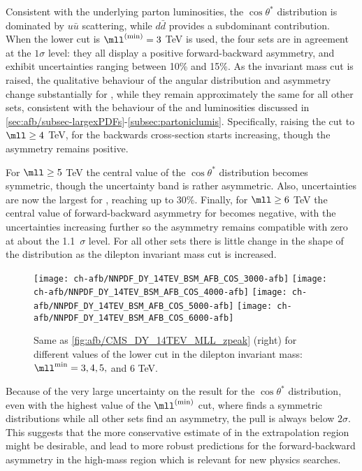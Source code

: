  Consistent with the underlying parton luminosities, the $\cos\theta^*$ distribution
 is dominated by $u\bar{u}$ scattering, while  $d\bar{d}$ provides
 a subdominant contribution.
 When the lower cut  is $\mll^{(\rm min)}=3$ TeV is used, the four \pdf
 sets are in agreement at the $1\sigma$ level: they all
 display a 
 positive forward-backward asymmetry, and exhibit \pdf uncertainties ranging between 10\% and 15\%.
 As the invariant mass cut is raised, the qualitative behaviour of the
 angular distribution and
 asymmetry change substantially for , while they remain
 approximately the same for all other \pdf sets, consistent with the
 behaviour of the \pdfs and luminosities discussed in
 \cref{sec:afb/subsec-largexPDFs}-\ref{subsec:partoniclumis}.
%
 Specifically,
 raising the cut to
 $\mll \ge 4$ TeV, for 
 the backwards cross-section starts increasing, though the asymmetry remains
positive.

For $\mll\ge 5$ TeV the central value of the  $\cos\theta^*$
 distribution  becomes symmetric, though the  \pdf uncertainty band is
 rather asymmetric. Also, \pdf uncertainties
 are now the largest for , reaching up to 30\%.
 Finally, for $\mll\ge 6$ TeV  the central value of 
 forward-backward asymmetry for  becomes negative, with the
 \pdf uncertainties increasing further so the asymmetry remains compatible
 with zero at about the 1.1~$\sigma$ level.
 For all other \pdf sets there is little change in the shape of the distribution as the
 dilepton invariant mass cut is increased.

\begin{figure}[t!]
 \centering
 \texttt{[image: ch-afb/NNPDF\_DY\_14TEV\_BSM\_AFB\_COS\_3000-afb]}
 \texttt{[image: ch-afb/NNPDF\_DY\_14TEV\_BSM\_AFB\_COS\_4000-afb]}
 \texttt{[image: ch-afb/NNPDF\_DY\_14TEV\_BSM\_AFB\_COS\_5000-afb]}
 \texttt{[image: ch-afb/NNPDF\_DY\_14TEV\_BSM\_AFB\_COS\_6000-afb]}
 \caption{Same as \cref{fig:afb/CMS_DY_14TEV_MLL_zpeak} (right)
   for different values of the  lower cut in the dilepton
   invariant mass: $\mll^{\rm min}=3, 4,5,$ and 6 TeV.
  }    
 \label{fig:afb/CMS_DY_14TEV_MLL_others_asy}
\end{figure}

Because of the very large uncertainty on the  result for the $\cos\theta^*$
distribution, even with
the highest value of the  $\mll^{(\rm  min)}$ cut, where  finds a
symmetric distributions while all other \pdf sets find an asymmetry,
the pull is always below $2 \sigma$.
%
This suggests that the more
conservative estimate of   in the extrapolation region might be
desirable, and lead to more robust predictions for the
forward-backward asymmetry in the high-mass region which is relevant
for new physics searches.
